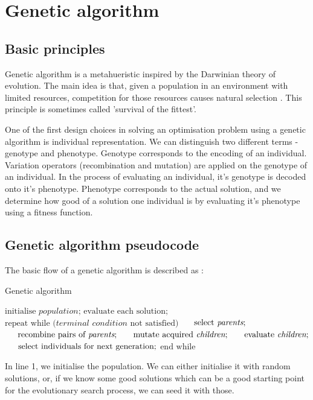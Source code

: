 \section{Genetic algorithm}
\subsection{Basic principles}
Genetic algorithm is a metahueristic inspired by the Darwinian theory of evolution. The main idea is that, given a population in an environment with limited resources, competition for those resources causes natural selection \citep{eiben2015evolutionarycomputing}.  This principle is sometimes called 'survival of the fittest'. 

One of the first design choices in solving an optimisation problem using a genetic algorithm is individual representation. We can distinguish two different terms - genotype and phenotype. Genotype corresponds to the encoding of an individual. Variation operators (recombination and mutation) are applied on the genotype of an individual. In the process of evaluating an individual, it's genotype is decoded onto it's phenotype. Phenotype corresponds to the actual solution, and we determine how good of a solution one individual is by evaluating it's phenotype using a fitness function.

\subsection{Genetic algorithm pseudocode}
The basic flow of a genetic algorithm is described as \citep{eiben2015evolutionarycomputing}:

\begin{algorithm}[]
\caption{Genetic algorithm}
\begin{algorithmic}[1]
\State $\text{initialise } \textit{population} \text{;}$
\State $\text{evaluate } \text{each solution};$
\State $\text{repeat while (} \textit{terminal condition} \text{ not satisfied)}$
\State $\indent \text{select } \textit{parents} \text{;}$
\State $\indent \text{recombine pairs of } \textit{parents} \text{;}$
\State $\indent \text{mutate acquired } \textit{children} \text{;}$
\State $\indent \text{evaluate } \textit{children} \text{;}$
\State $\indent \text{select individuals for next generation;}$
\State $\text{end while}$
\end{algorithmic}
\end{algorithm}

In line 1, we initialise the population. We can either initialise it with random solutions, or, if we know some good solutions which can be a good starting point for the evolutionary search process, we can seed it with those.

